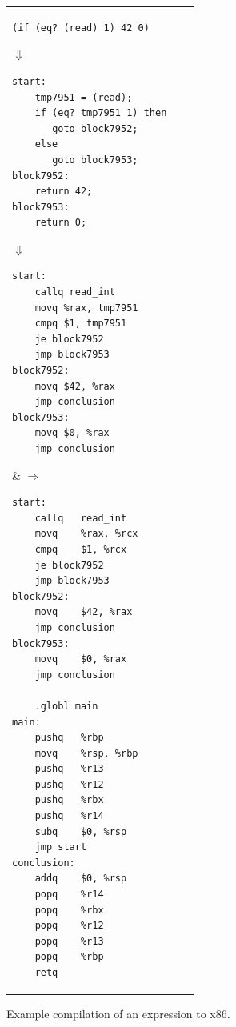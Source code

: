 \documentclass[11pt]{book}
\begin{document}
\begin{figure}[tbp]
\begin{tabular}{lll}
\begin{minipage}{0.5\textwidth}
\begin{lstlisting}
(if (eq? (read) 1) 42 0)
\end{lstlisting}
$\Downarrow$
\begin{lstlisting}
start:
    tmp7951 = (read);
    if (eq? tmp7951 1) then
       goto block7952;
    else
       goto block7953;
block7952:
    return 42;
block7953:
    return 0;
\end{lstlisting}
$\Downarrow$
\begin{lstlisting}
start:
    callq read_int
    movq %rax, tmp7951
    cmpq $1, tmp7951
    je block7952
    jmp block7953
block7952:
    movq $42, %rax
    jmp conclusion
block7953:
    movq $0, %rax
    jmp conclusion
\end{lstlisting}
\end{minipage}
&
$\Rightarrow\qquad$
\begin{minipage}{0.4\textwidth}
\begin{lstlisting}
start:
	callq	read_int
	movq	%rax, %rcx
	cmpq	$1, %rcx
	je block7952
	jmp block7953
block7952:
	movq	$42, %rax
	jmp conclusion
block7953:
	movq	$0, %rax
	jmp conclusion

	.globl main
main:
	pushq	%rbp
	movq	%rsp, %rbp
	pushq	%r13
	pushq	%r12
	pushq	%rbx
	pushq	%r14
	subq	$0, %rsp
	jmp start
conclusion:
	addq	$0, %rsp
	popq	%r14
	popq	%rbx
	popq	%r12
	popq	%r13
	popq	%rbp
	retq
\end{lstlisting}
\end{minipage}
\end{tabular}
\caption{Example compilation of an  expression to x86.}
\label{fig:if-example-x86}
\end{figure}
\end{document}
